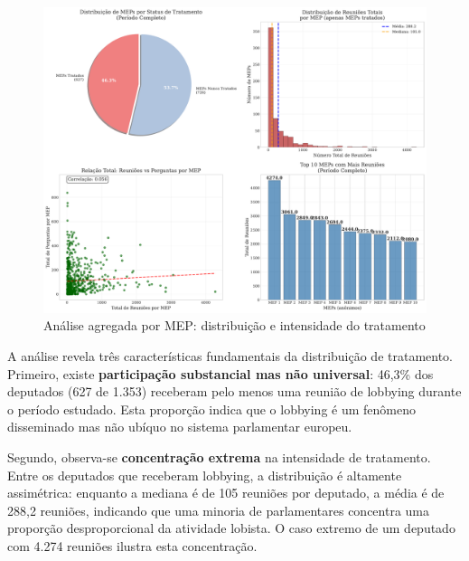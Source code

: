 \begin{figure}[htbp]
\centering
\includegraphics[width=\textwidth]{figures/fig6_mep_aggregated_analysis.pdf}
\caption{Análise agregada por MEP: distribuição e intensidade do tratamento}
\label{fig:mep_aggregated}
\end{figure}

A análise revela três características fundamentais da distribuição de tratamento. Primeiro, existe \textbf{participação substancial mas não universal}: 46,3\% dos deputados (627 de 1.353) receberam pelo menos uma reunião de lobbying durante o período estudado. Esta proporção indica que o lobbying é um fenômeno disseminado mas não ubíquo no sistema parlamentar europeu.

Segundo, observa-se \textbf{concentração extrema} na intensidade de tratamento. Entre os deputados que receberam lobbying, a distribuição é altamente assimétrica: enquanto a mediana é de 105 reuniões por deputado, a média é de 288,2 reuniões, indicando que uma minoria de parlamentares concentra uma proporção desproporcional da atividade lobista. O caso extremo de um deputado com 4.274 reuniões ilustra esta concentração.

